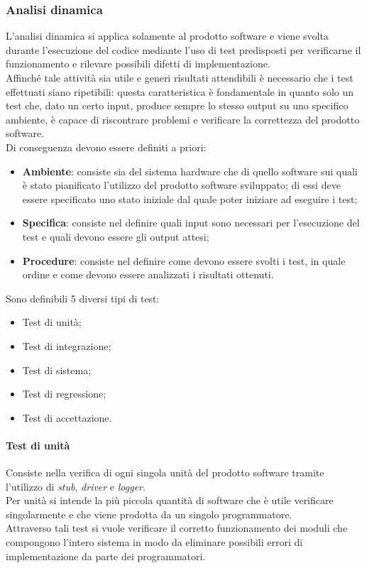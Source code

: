 \subsubsection{Analisi dinamica}
L'analisi dinamica si applica solamente al prodotto software e viene svolta durante l'esecuzione del codice mediante l'uso di test predisposti per verificarne il funzionamento e rilevare possibili difetti di implementazione.\\
Affinché tale attività sia utile e generi risultati attendibili è necessario che i test effettuati siano ripetibili: questa caratteristica è fondamentale in quanto solo un test che, dato un certo input, produce sempre lo stesso output su uno specifico ambiente, è capace di riscontrare problemi e verificare la correttezza del prodotto software.\\
Di conseguenza devono essere definiti a priori:
\begin{itemize}
\item \textbf{Ambiente}: consiste sia del sistema hardware che di quello software sui quali è stato pianificato l'utilizzo del prodotto software sviluppato; di essi deve essere specificato uno stato iniziale dal quale poter iniziare ad eseguire i test;
\item \textbf{Specifica}: consiste nel definire quali input sono necessari per l'esecuzione del test e quali devono essere gli output attesi;
\item \textbf{Procedure}: consiste nel definire come devono essere svolti i test, in quale ordine e come devono essere analizzati i risultati ottenuti.
\end{itemize}
Sono definibili 5 diversi tipi di test: 
\begin{itemize}
\item Test di unità;
\item Test di integrazione;
\item Test di sistema;
\item Test di regressione;
\item Test di accettazione.  
\end{itemize}

\paragraph{Test di unità}
Consiste nella verifica di ogni singola unità del prodotto software tramite l'utilizzo di \textit{stub}, \textit{driver} e \textit{logger}.\\
Per unità si intende la più piccola quantità di software che è utile verificare singolarmente e che viene prodotta da un singolo programmatore.\\
Attraverso tali test si vuole verificare il corretto funzionamento dei moduli che compongono l'intero sistema in modo da eliminare possibili errori di implementazione da parte dei programmatori.

